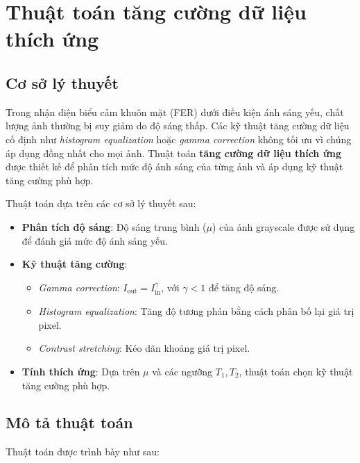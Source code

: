\documentclass[a4paper,12pt]{article}
\begin{document}
\section{Thuật toán tăng cường dữ liệu thích ứng}

\subsection{Cơ sở lý thuyết}
Trong nhận diện biểu cảm khuôn mặt (FER) dưới điều kiện ánh sáng yếu, chất lượng ảnh thường bị suy giảm do độ sáng thấp. Các kỹ thuật tăng cường dữ liệu cố định như \textit{histogram equalization} hoặc \textit{gamma correction} không tối ưu vì chúng áp dụng đồng nhất cho mọi ảnh. Thuật toán \textbf{tăng cường dữ liệu thích ứng} được thiết kế để phân tích mức độ ánh sáng của từng ảnh và áp dụng kỹ thuật tăng cường phù hợp.

Thuật toán dựa trên các cơ sở lý thuyết sau:
\begin{itemize}
    \item \textbf{Phân tích độ sáng}: Độ sáng trung bình (\( \mu \)) của ảnh grayscale được sử dụng để đánh giá mức độ ánh sáng yếu.
    \item \textbf{Kỹ thuật tăng cường}:
    \begin{itemize}
        \item \textit{Gamma correction}: \( I_{\text{out}} = I_{\text{in}}^{\gamma} \), với \( \gamma < 1 \) để tăng độ sáng.
        \item \textit{Histogram equalization}: Tăng độ tương phản bằng cách phân bố lại giá trị pixel.
        \item \textit{Contrast stretching}: Kéo dãn khoảng giá trị pixel.
    \end{itemize}
    \item \textbf{Tính thích ứng}: Dựa trên \( \mu \) và các ngưỡng \( T_1, T_2 \), thuật toán chọn kỹ thuật tăng cường phù hợp.
\end{itemize}

\subsection{Mô tả thuật toán}
Thuật toán được trình bày như sau:
\end{document}
